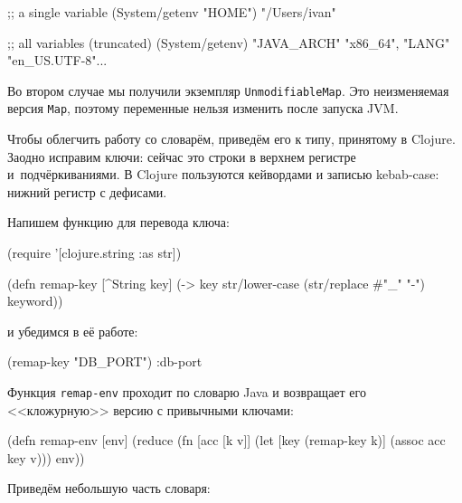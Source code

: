 \else

\begin{english}
  \begin{clojure}
;; a single variable
(System/getenv "HOME")
"/Users/ivan"

;; all variables (truncated)
(System/getenv)
{"JAVA_ARCH" "x86_64", "LANG" "en_US.UTF-8"...}
  \end{clojure}
\end{english}

\fi

Во втором случае мы получили экземпляр \texttt{UnmodifiableMap}. Это
неизменяемая версия \verb|Map|, поэтому переменные нельзя изменить после запуска
JVM.

Чтобы облегчить работу со словарём, приведём его к типу, принятому в
Clojure. Заодно исправим ключи: сейчас это строки в верхнем регистре
и~подчёркиваниями. В Clojure пользуются кейвордами и записью kebab-case: нижний
регистр с дефисами.

Напишем функцию для перевода ключа:

\begin{english}
  \begin{clojure}
(require '[clojure.string :as str])

(defn remap-key [^String key]
  (-> key
      str/lower-case
      (str/replace #"_" "-")
      keyword))
  \end{clojure}
\end{english}

\noindent
и убедимся в её работе:

\begin{english}
  \begin{clojure}
(remap-key "DB_PORT")
:db-port
  \end{clojure}
\end{english}


Функция \verb|remap-env| проходит по словарю Java и возвращает его
<<кложурную>> версию с привычными ключами:

\begin{english}
  \begin{clojure}
(defn remap-env [env]
  (reduce
   (fn [acc [k v]]
     (let [key (remap-key k)]
       (assoc acc key v)))
   {}
   env))
  \end{clojure}
\end{english}

Приведём небольшую часть словаря:

